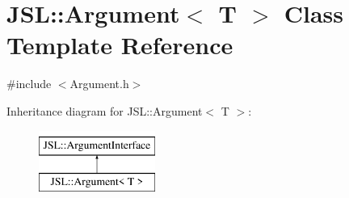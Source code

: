 \hypertarget{classJSL_1_1Argument}{}\section{J\+SL\+:\+:Argument$<$ T $>$ Class Template Reference}
\label{classJSL_1_1Argument}


{\ttfamily \#include $<$Argument.\+h$>$}

Inheritance diagram for J\+SL\+:\+:Argument$<$ T $>$\+:\begin{figure}[H]
\begin{center}
\leavevmode
\includegraphics[height=2.000000cm]{classJSL_1_1Argument}
\end{center}
\end{figure}
